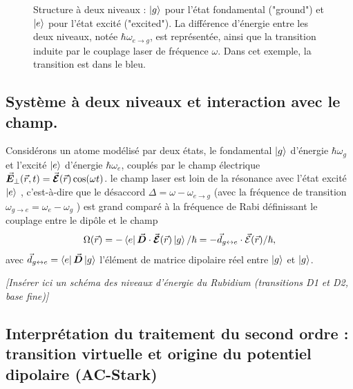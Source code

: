 \begin{figure}[!htb]
\begin{tikzpicture}
\end{tikzpicture}
\caption{Structure à deux niveaux : $\ket{g}$ pour l’état fondamental ("ground") et $\ket{e}$ pour l’état excité ("excited"). La différence d’énergie entre les deux niveaux, notée $\hbar \omega_{e \rightarrow g}$, est représentée, ainsi que la transition induite par le couplage laser de fréquence $\omega$. Dans cet exemple, la transition est dans le bleu.}

\end{figure}


\subsection{Système à deux niveaux et interaction avec le champ.}


Considérons un atome modélisé par deux états, le fondamental $\ket{g}$ d'énergie $\hbar \omega_g$  et l’excité $\ket{e}$ d'énergie $\hbar \omega_e$, couplés par le champ électrique $\operatorvec{E}_\perp(\vec{r} , t ) = \operatorvec{\mathcal{E}}(\vec{r}) \cos ( \omega t )  $. le champ laser est loin de la résonance avec l’état excité $\ket{e}$ , c’est-à-dire que le désaccord $\Delta = \omega - \omega_{e\rightarrow g}$ (avec la fréquence de transition $\omega_{g\rightarrow e} = \omega_e - \omega_g $ ) est grand comparé à la fréquence de Rabi définissant le couplage entre le dipôle et le champ 
\[\Omega(\vec{r}) = -  \bra{e} \operatorvec{D} \cdot \operatorvec{\mathcal{E}}(\vec{r}) \ket{g}/\hbar = - \vec{d}_{g\leftrightarrow e } \cdot  \vec{\mathcal{E}}(\vec{r}) /\hbar,
\] avec $\vec{d}_{g\leftrightarrow e } = \bra{e} \operatorvec{D} \ket{g} $ l’élément de matrice dipolaire réel entre $\ket{g}$ et $\ket{g}$. 

\vspace{1em}
\begin{center}
\textit{[Insérer ici un schéma des niveaux d’énergie du Rubidium (transitions D1 et D2, base fine)]}
\end{center}

\subsection{Interprétation du traitement du second ordre : transition virtuelle et origine du potentiel dipolaire (AC-Stark)}


